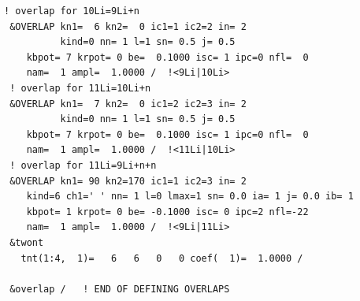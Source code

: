 \documentclass[11pt]{book}
\begin{document}
\begin{small}
\begin{itemize}
\end{itemize}       
\begin{lstlisting}[frame=single]  
 ! overlap for 10Li=9Li+n                                                             
 &OVERLAP kn1=  6 kn2=  0 ic1=1 ic2=2 in= 2                                     
          kind=0 nn= 1 l=1 sn= 0.5 j= 0.5                                       
    kbpot= 7 krpot= 0 be=  0.1000 isc= 1 ipc=0 nfl=  0 
    nam=  1 ampl=  1.0000 /  !<9Li|10Li>
 ! overlap for 11Li=10Li+n   
 &OVERLAP kn1=  7 kn2=  0 ic1=2 ic2=3 in= 2                                     
          kind=0 nn= 1 l=1 sn= 0.5 j= 0.5                                       
    kbpot= 7 krpot= 0 be=  0.1000 isc= 1 ipc=0 nfl=  0 
    nam=  1 ampl=  1.0000 /  !<11Li|10Li>
 ! overlap for 11Li=9Li+n+n 
 &OVERLAP kn1= 90 kn2=170 ic1=1 ic2=3 in= 2                                     
    kind=6 ch1=' ' nn= 1 l=0 lmax=1 sn= 0.0 ia= 1 j= 0.0 ib= 1                  
    kbpot= 1 krpot= 0 be= -0.1000 isc= 0 ipc=2 nfl=-22 
    nam=  1 ampl=  1.0000 /  !<9Li|11Li>
 &twont                                                                         
   tnt(1:4,  1)=   6   6   0   0 coef(  1)=  1.0000 /
                                                                                    
 &overlap /   ! END OF DEFINING OVERLAPS                                        

\end{lstlisting}
\end{small}
\end{document}

